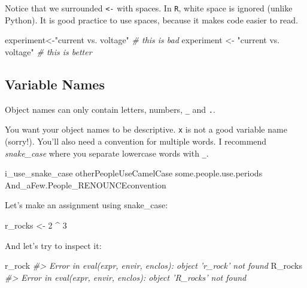 \documentclass[]{book}
\newenvironment{Shaded}{\begin{snugshade}}{\end{snugshade}}
\newcommand{\CommentTok}[1]{\textcolor[rgb]{0.56,0.35,0.01}{\textit{#1}}}
\newcommand{\DecValTok}[1]{\textcolor[rgb]{0.00,0.00,0.81}{#1}}
\newcommand{\NormalTok}[1]{#1}
\newcommand{\OperatorTok}[1]{\textcolor[rgb]{0.81,0.36,0.00}{\textbf{#1}}}
\newcommand{\StringTok}[1]{\textcolor[rgb]{0.31,0.60,0.02}{#1}}
\begin{document}
Notice that we surrounded \texttt{\textless{}-} with spaces. In \texttt{R}, white space is ignored (unlike Python). It is good practice to use spaces, because it makes code easier to read.

\begin{Shaded}
\begin{Highlighting}[]
\NormalTok{experiment<-}\StringTok{"current vs. voltage"}   \CommentTok{# this is bad}
\NormalTok{experiment <-}\StringTok{ "current vs. voltage"} \CommentTok{# this is better}
\end{Highlighting}
\end{Shaded}

\hypertarget{variable-names}{%
\subsection{Variable Names}\label{variable-names}}

Object names can only contain letters, numbers, \texttt{\_} and \texttt{.}.

You want your object names to be descriptive. \texttt{x} is not a good variable name (sorry!). You'll also need a convention for multiple words. I recommend \emph{snake\_case} where you separate lowercase words with \texttt{\_}.

\begin{Shaded}
\begin{Highlighting}[]
\NormalTok{i_use_snake_case}
\NormalTok{otherPeopleUseCamelCase}
\NormalTok{some.people.use.periods}
\NormalTok{And_aFew.People_RENOUNCEconvention}
\end{Highlighting}
\end{Shaded}

Let's make an assignment using snake\_case:

\begin{Shaded}
\begin{Highlighting}[]
\NormalTok{r_rocks <-}\StringTok{ }\DecValTok{2} \OperatorTok{^}\StringTok{ }\DecValTok{3}
\end{Highlighting}
\end{Shaded}

And let's try to inspect it:

\begin{Shaded}
\begin{Highlighting}[]
\NormalTok{r_rock}
\CommentTok{#> Error in eval(expr, envir, enclos): object 'r_rock' not found}
\NormalTok{R_rocks}
\CommentTok{#> Error in eval(expr, envir, enclos): object 'R_rocks' not found}
\end{Highlighting}
\end{Shaded}
\end{document}
